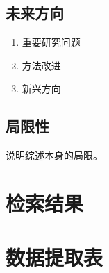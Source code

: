 \documentclass[11pt,a4paper]{article}
\begin{document}
\subsection{未来方向}
\begin{enumerate}
    \item 重要研究问题
    \item 方法改进
    \item 新兴方向
\end{enumerate}

\subsection{局限性}
说明综述本身的局限。

\newpage



\newpage
\appendix
\section{检索结果}
\label{app:search}

\section{数据提取表}
\label{app:data}
\end{document}
